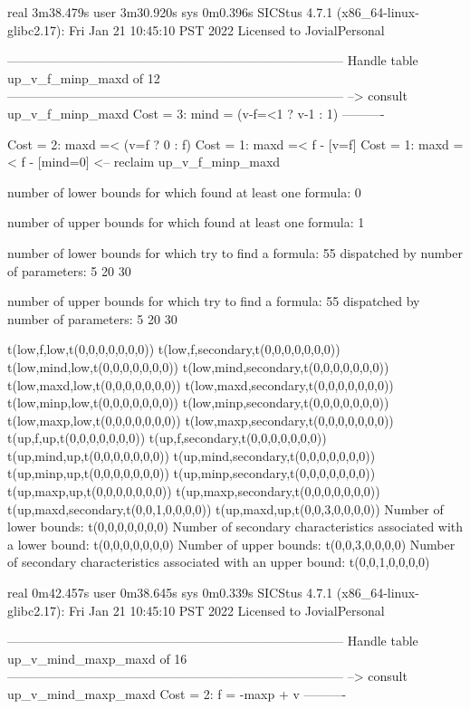 real	3m38.479s
user	3m30.920s
sys	0m0.396s
SICStus 4.7.1 (x86_64-linux-glibc2.17): Fri Jan 21 10:45:10 PST 2022
Licensed to JovialPersonal


--------------------------------------------------------------------------------
Handle table up_v_f_minp_maxd of 12
--------------------------------------------------------------------------------
--> consult up_v_f_minp_maxd
Cost =  3:  mind = (v-f=<1 ? v-1 : 1)
----------

Cost =  2:  maxd =< (v=f ? 0 : f)
Cost =  1:  maxd =< f - [v=f] %
Cost =  1:  maxd =< f - [mind=0] %
<-- reclaim up_v_f_minp_maxd

number of lower bounds for which found at least one formula: 0

number of upper bounds for which found at least one formula: 1

number of lower bounds for which try to find a formula: 55
dispatched by number of parameters: 5  20  30

number of upper bounds for which try to find a formula: 55
dispatched by number of parameters: 5  20  30

t(low,f,low,t(0,0,0,0,0,0,0))
t(low,f,secondary,t(0,0,0,0,0,0,0))
t(low,mind,low,t(0,0,0,0,0,0,0))
t(low,mind,secondary,t(0,0,0,0,0,0,0))
t(low,maxd,low,t(0,0,0,0,0,0,0))
t(low,maxd,secondary,t(0,0,0,0,0,0,0))
t(low,minp,low,t(0,0,0,0,0,0,0))
t(low,minp,secondary,t(0,0,0,0,0,0,0))
t(low,maxp,low,t(0,0,0,0,0,0,0))
t(low,maxp,secondary,t(0,0,0,0,0,0,0))
t(up,f,up,t(0,0,0,0,0,0,0))
t(up,f,secondary,t(0,0,0,0,0,0,0))
t(up,mind,up,t(0,0,0,0,0,0,0))
t(up,mind,secondary,t(0,0,0,0,0,0,0))
t(up,minp,up,t(0,0,0,0,0,0,0))
t(up,minp,secondary,t(0,0,0,0,0,0,0))
t(up,maxp,up,t(0,0,0,0,0,0,0))
t(up,maxp,secondary,t(0,0,0,0,0,0,0))
t(up,maxd,secondary,t(0,0,1,0,0,0,0))
t(up,maxd,up,t(0,0,3,0,0,0,0))
Number of lower bounds:                                             t(0,0,0,0,0,0,0)
Number of secondary characteristics associated with a lower bound:  t(0,0,0,0,0,0,0)
Number of upper bounds:                                             t(0,0,3,0,0,0,0)
Number of secondary characteristics associated with an upper bound: t(0,0,1,0,0,0,0)

real	0m42.457s
user	0m38.645s
sys	0m0.339s
SICStus 4.7.1 (x86_64-linux-glibc2.17): Fri Jan 21 10:45:10 PST 2022
Licensed to JovialPersonal


--------------------------------------------------------------------------------
Handle table up_v_mind_maxp_maxd of 16
--------------------------------------------------------------------------------
--> consult up_v_mind_maxp_maxd
Cost =  2:  f = -maxp + v
----------

